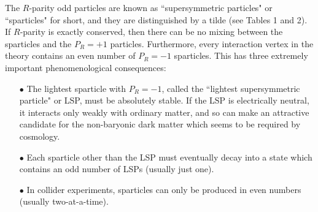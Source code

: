 The $R$-parity odd particles are known as ``supersymmetric
particles" or ``sparticles" for short, and they are distinguished
by a tilde (see Tables 1 and 2). If $R$-parity is exactly conserved,
then
there can be no mixing between the sparticles and the $P_R=+1$
particles. Furthermore, every interaction vertex in the theory contains
an even number of $P_R=-1$ sparticles. This has three extremely important
phenomenological consequences:
\begin{itemize}
\item[$\bullet$]
The lightest sparticle with $P_R=-1$, called the
``lightest supersymmetric particle" or LSP, must be absolutely stable.
If the LSP is electrically neutral, it interacts only weakly with
ordinary matter, and so can make an attractive candidate
\cite{neutralinodarkmatter}
for the non-baryonic dark matter which seems
to be required by cosmology.

\item[$\bullet$]
Each sparticle other than the LSP must eventually
decay into a state which contains an odd number of LSPs
(usually just one).
\item[$\bullet$]
In collider experiments, sparticles can only be
produced in even numbers (usually two-at-a-time).
\end{itemize}

